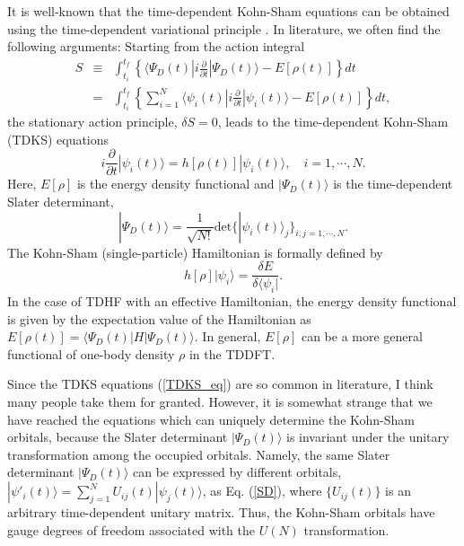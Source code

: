 \documentclass[twoside]{article}
\newcommand{\bra}[1]{\langle {#1} |}
\newcommand{\ket}[1]{| {#1} \rangle}
\begin{document}
{It is well-known that the time-dependent Kohn-Sham equations
can be obtained using the time-dependent variational principle \cite{KK76}.
In literature, we often find the following arguments:
Starting from the action integral
\begin{eqnarray}
\label{action_1}
S &\equiv& \int_{t_i}^{t_f} \left\{
\bra{\Psi_D(t)} i\frac{\partial}{\partial t} \ket{\Psi_D(t)}
- E[\rho(t)] 
\right\} dt \\
\label{action_2}
&=&
\int_{t_i}^{t_f} \left\{
\sum_{i=1}^N \bra{\psi_i(t)} i\frac{\partial}{\partial t} \ket{\psi_i(t)}
- E[\rho(t)] 
\right\} dt ,
\end{eqnarray}
the stationary action principle, $\delta S=0$, leads to the
time-dependent Kohn-Sham (TDKS) equations
\begin{equation}
\label{TDKS_eq}
i\frac{\partial}{\partial t} \ket{\psi_i(t)} = h[\rho(t)] \ket{\psi_i(t)} ,
\quad i=1,\cdots,N .
\end{equation}
Here, $E[\rho]$ is the energy density functional and
$\ket{\Psi_D(t)}$ is the time-dependent Slater determinant,
\begin{equation}
\label{SD}
\ket{\Psi_D(t)} = \frac{1}{\sqrt{N!}}
\textrm{det}\{ \ket{\psi_i(t)}_j \}_{i,j=1,\cdots, N} .
\end{equation}
The Kohn-Sham (single-particle) Hamiltonian is formally defined by
\begin{equation}
h[\rho] \ket{\psi_i} = \frac{\delta E}{\delta \bra{\psi_i}} .
\end{equation}
In the case of TDHF with an effective Hamiltonian, the energy density
functional is given by the expectation value of the
Hamiltonian as $E[\rho(t)] = \bra{\Psi_D(t)} H \ket{\Psi_D(t)}$.
In general, $E[\rho]$ can be a more general functional of one-body density
$\rho$ in the TDDFT.

Since the TDKS equations (\ref{TDKS_eq}) are so common in literature,
I think many people take them for granted.
However, it is somewhat strange that
we have reached the equations which can uniquely
determine the Kohn-Sham orbitals, because
the Slater determinant $\ket{\Psi_D(t)}$ is invariant under the
unitary transformation among the occupied orbitals.
Namely,  the same Slater determinant $\ket{\Psi_D(t)}$ can be expressed by
different orbitals,
$\ket{\psi'_i(t)} = \sum_{j=1}^N U_{ij}(t) \ket{\psi_j(t)}$,
as Eq. (\ref{SD}), where $\{ U_{ij}(t) \}$ is
an arbitrary time-dependent unitary matrix.
Thus, the Kohn-Sham orbitals have gauge degrees of freedom associated
with the $U(N)$ transformation.

}
\end{document}
